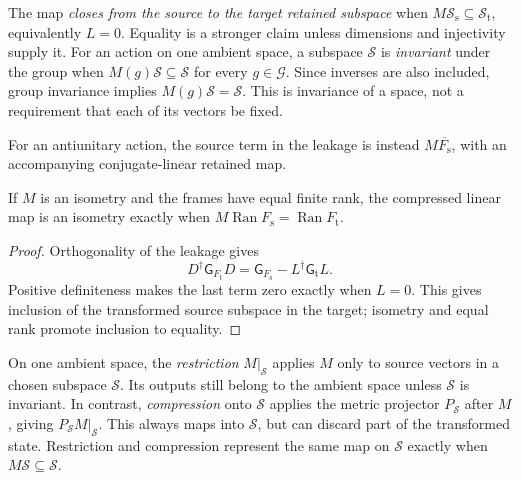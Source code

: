 \begin{definition}
\label{def:symmetry-subspace-closure}
The map \emph{closes from the source to the target retained subspace} when
$M\mathcal S_{\mathrm s}\subseteq\mathcal S_{\mathrm t}$, equivalently
$L=0$. Equality is a stronger claim unless dimensions and injectivity supply
it. For an action on one ambient space, a subspace $\mathcal S$ is
\emph{invariant} under the group when $M(g)\mathcal S\subseteq\mathcal S$
for every $g\in\mathcal G$. Since inverses are also included, group
invariance implies $M(g)\mathcal S=\mathcal S$. This is invariance of a
space, not a requirement that each of its vectors be fixed.
\end{definition}

For an antiunitary action, the source term in the leakage is instead
$M\overline{F_{\mathrm s}}$, with an accompanying conjugate-linear retained map.

\begin{proposition}
If $M$ is an isometry and the frames have equal finite rank, the compressed
linear map is an isometry exactly when $M\operatorname{Ran}F_{\mathrm s}
=\operatorname{Ran}F_{\mathrm t}$.
\end{proposition}
\begin{proof}
Orthogonality of the leakage gives
\begin{equation}
  D^{\dagger}\mathsf G_{F_{\mathrm t}}D
  =\mathsf G_{F_{\mathrm s}}-L^{\dagger}\mathsf G_{\mathrm t}L.
  \label{eq:symmetry-leakage-defect}
\end{equation}
Positive definiteness makes the last term zero exactly when $L=0$.
This gives inclusion of the transformed source subspace in the target;
isometry and equal rank promote inclusion to equality.
\end{proof}

\begin{definition}
\label{def:symmetry-restriction-compression}
On one ambient space, the \emph{restriction} $M|_{\mathcal S}$ applies $M$
only to source vectors in a chosen subspace $\mathcal S$. Its outputs still
belong to the ambient space unless $\mathcal S$ is invariant. In contrast,
\emph{compression} onto $\mathcal S$ applies the metric projector
$P_{\mathcal S}$ after $M$, giving $P_{\mathcal S}M|_{\mathcal S}$.
This always maps into $\mathcal S$, but can discard part of the transformed
state. Restriction and compression represent the same map on $\mathcal S$
exactly when $M\mathcal S\subseteq\mathcal S$.
\end{definition}

